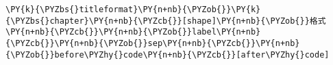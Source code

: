 \begin{Verbatim}[commandchars=\\\{\}]
\PY{k}{\PYZbs{}titleformat}\PY{n+nb}{\PYZob{}}\PY{k}{\PYZbs{}chapter}\PY{n+nb}{\PYZcb{}}[shape]\PY{n+nb}{\PYZob{}}格式\PY{n+nb}{\PYZcb{}}\PY{n+nb}{\PYZob{}}label\PY{n+nb}{\PYZcb{}}\PY{n+nb}{\PYZob{}}sep\PY{n+nb}{\PYZcb{}}\PY{n+nb}{\PYZob{}}before\PYZhy{}code\PY{n+nb}{\PYZcb{}}[after\PYZhy{}code]
\end{Verbatim}
